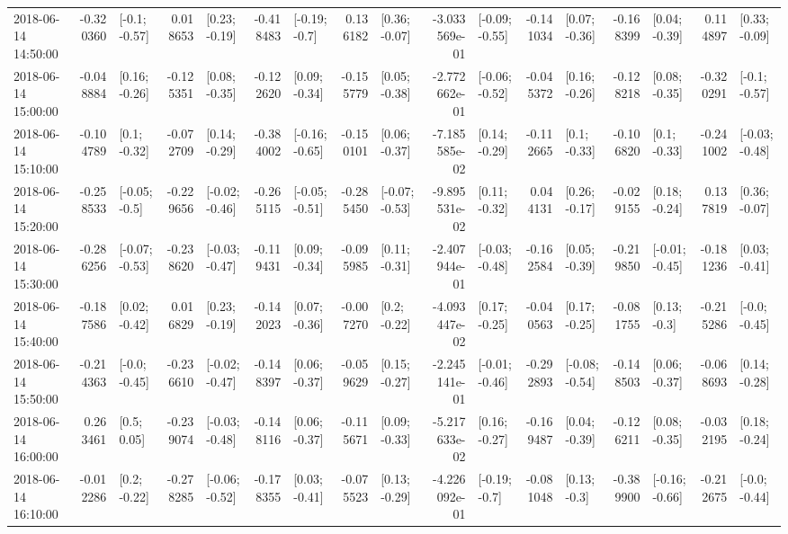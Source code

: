 \begin{tabular}{lrlrlrlrlrlrlrlrl}
2018-06-14 14:50:00 & -0.320360 &   [-0.1; -0.57] &  0.018653 &   [0.23; -0.19] & -0.418483 &   [-0.19; -0.7] &  0.136182 &   [0.36; -0.07] & -3.033569e-01 &  [-0.09; -0.55] & -0.141034 &   [0.07; -0.36] & -0.168399 &   [0.04; -0.39] &  0.114897 &   [0.33; -0.09] \\
2018-06-14 15:00:00 & -0.048884 &   [0.16; -0.26] & -0.125351 &   [0.08; -0.35] & -0.122620 &   [0.09; -0.34] & -0.155779 &   [0.05; -0.38] & -2.772662e-01 &  [-0.06; -0.52] & -0.045372 &   [0.16; -0.26] & -0.128218 &   [0.08; -0.35] & -0.320291 &   [-0.1; -0.57] \\
2018-06-14 15:10:00 & -0.104789 &    [0.1; -0.32] & -0.072709 &   [0.14; -0.29] & -0.384002 &  [-0.16; -0.65] & -0.150101 &   [0.06; -0.37] & -7.185585e-02 &   [0.14; -0.29] & -0.112665 &    [0.1; -0.33] & -0.106820 &    [0.1; -0.33] & -0.241002 &  [-0.03; -0.48] \\
2018-06-14 15:20:00 & -0.258533 &   [-0.05; -0.5] & -0.229656 &  [-0.02; -0.46] & -0.265115 &  [-0.05; -0.51] & -0.285450 &  [-0.07; -0.53] & -9.895531e-02 &   [0.11; -0.32] &  0.044131 &   [0.26; -0.17] & -0.029155 &   [0.18; -0.24] &  0.137819 &   [0.36; -0.07] \\
2018-06-14 15:30:00 & -0.286256 &  [-0.07; -0.53] & -0.238620 &  [-0.03; -0.47] & -0.119431 &   [0.09; -0.34] & -0.095985 &   [0.11; -0.31] & -2.407944e-01 &  [-0.03; -0.48] & -0.162584 &   [0.05; -0.39] & -0.219850 &  [-0.01; -0.45] & -0.181236 &   [0.03; -0.41] \\
2018-06-14 15:40:00 & -0.187586 &   [0.02; -0.42] &  0.016829 &   [0.23; -0.19] & -0.142023 &   [0.07; -0.36] & -0.007270 &    [0.2; -0.22] & -4.093447e-02 &   [0.17; -0.25] & -0.040563 &   [0.17; -0.25] & -0.081755 &    [0.13; -0.3] & -0.215286 &   [-0.0; -0.45] \\
2018-06-14 15:50:00 & -0.214363 &   [-0.0; -0.45] & -0.236610 &  [-0.02; -0.47] & -0.148397 &   [0.06; -0.37] & -0.059629 &   [0.15; -0.27] & -2.245141e-01 &  [-0.01; -0.46] & -0.292893 &  [-0.08; -0.54] & -0.148503 &   [0.06; -0.37] & -0.068693 &   [0.14; -0.28] \\
2018-06-14 16:00:00 &  0.263461 &     [0.5; 0.05] & -0.239074 &  [-0.03; -0.48] & -0.148116 &   [0.06; -0.37] & -0.115671 &   [0.09; -0.33] & -5.217633e-02 &   [0.16; -0.27] & -0.169487 &   [0.04; -0.39] & -0.126211 &   [0.08; -0.35] & -0.032195 &   [0.18; -0.24] \\
2018-06-14 16:10:00 & -0.012286 &    [0.2; -0.22] & -0.278285 &  [-0.06; -0.52] & -0.178355 &   [0.03; -0.41] & -0.075523 &   [0.13; -0.29] & -4.226092e-01 &   [-0.19; -0.7] & -0.081048 &    [0.13; -0.3] & -0.389900 &  [-0.16; -0.66] & -0.212675 &   [-0.0; -0.44] \\

\end{tabular}
